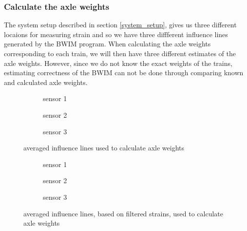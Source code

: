 \subsubsection{Calculate the axle weights}
\label{section:calculating_axle_weights}
The system setup described in section \ref{system_setup}, gives us three different locaions for measuring strain and so we have three diffferent influence lines generated by the BWIM program. When calculating the axle weights corresponding to each train, we will then have three different estimates of the axle weights. However, since we do not know the exact weights of the trains, estimating correctness of the BWIM can not be done through comparing known and calculated axle weights.



\begin{figure}[h]
	\begin{subfigure}[t]{0.3\textwidth}
		
		\caption{sensor 1}
		\label{fig:sensor1_averaged}
	\end{subfigure}
	\begin{subfigure}[t]{0.3\textwidth}
		
		\caption{sensor 2}
		\label{fig:sensor2_averaged}
	\end{subfigure}
	\begin{subfigure}[t]{0.3\textwidth}
		
		\caption{sensor 3}
		\label{fig:sensor3_averaged}
	\end{subfigure}
	\caption{averaged influence lines used to calculate axle weights}
	\label{averaged_infl_lines}
\end{figure}

\begin{figure}[h]
	\begin{subfigure}[t]{0.3\textwidth}
		
		\caption{sensor 1}
		\label{fig:sensor1_averaged}
	\end{subfigure}
	\begin{subfigure}[t]{0.3\textwidth}
		
		\caption{sensor 2}
		\label{fig:sensor2_averaged}
	\end{subfigure}
	\begin{subfigure}[t]{0.3\textwidth}
		
		\caption{sensor 3}
		\label{fig:sensor3_averaged}
	\end{subfigure}
	\caption{averaged influence lines, based on filtered strains, used to calculate axle weights}
	\label{averaged_filtered_infl_lines}
\end{figure}

